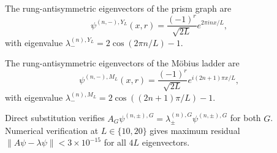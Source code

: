 \documentclass[aps,pra,reprint,amsmath,amssymb,superscriptaddress,nofootinbib,longbibliography]{revtex4-2}
\begin{document}
The rung-antisymmetric eigenvectors of the prism graph are
\begin{equation}
\psi^{(n,-),Y_L}(x, r) = \frac{(-1)^r}{\sqrt{2L}} e^{2\pi i n x / L},
\end{equation}
with eigenvalue $\lambda_-^{(n), Y_L} = 2\cos(2\pi n/L) - 1$.

The rung-antisymmetric eigenvectors of the M\"obius ladder are
\begin{equation}
\psi^{(n,-),M_L}(x, r) = \frac{(-1)^r}{\sqrt{2L}} e^{i(2n+1)\pi x / L},
\end{equation}
with eigenvalue $\lambda_-^{(n), M_L} = 2\cos((2n+1)\pi/L) - 1$.

Direct substitution verifies $A_G \psi^{(n, \pm), G} = \lambda_\pm^{(n), G} \psi^{(n, \pm), G}$ for both $G$. Numerical verification at $L \in \{10, 20\}$ gives maximum residual $\|A\psi - \lambda\psi\| < 3 \times 10^{-15}$ for all $4L$ eigenvectors.




\end{document}

